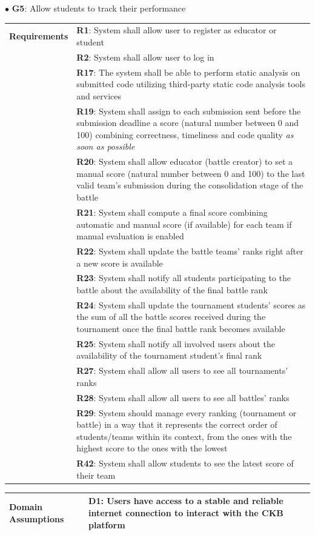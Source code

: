 \newpage
$\bullet$ \textbf{G5}: Allow students to track their performance
\begin{center}
    \begin{tabular}{ |m{3cm}|m{10cm}| }
        \hline
        \textbf{Requirements} 
        & \textbf{R1}: System shall allow user to register as educator or student \\
        & \textbf{R2}: System shall allow user to log in \\
        & \textbf{R17}: The system shall be able to perform static analysis on submitted code utilizing third-party static code analysis tools and services \\
        & \textbf{R19}: System shall assign to each submission sent before the submission deadline a score (natural number between 0 and 100) combining correctness, timeliness and code quality \textit{as soon as possible} \\
        & \textbf{R20}: System shall allow educator (battle creator) to set a manual score (natural number between 0 and 100) to the last valid team’s submission during the consolidation stage of the battle \\
        & \textbf{R21}: System shall compute a final score combining automatic and manual score (if available) for each team if manual evaluation is enabled \\
        & \textbf{R22}: System shall update the battle teams’ ranks right after a new score is available \\
        & \textbf{R23}: System shall notify all students participating to the battle about the availability of the final battle rank \\
        & \textbf{R24}: System shall update the tournament students’ scores as the sum of all the battle scores received during the tournament once the final battle rank becomes available \\
        & \textbf{R25}: System shall notify all involved users about the availability of the tournament student’s final rank \\
        & \textbf{R27}: System shall allow all users to see all tournaments’ ranks \\
        & \textbf{R28}: System shall allow all users to see all battles' ranks \\
        & \textbf{R29}: System should manage every ranking (tournament or battle) in a way that it represents the correct order of students/teams within its context, from the ones with the highest score to the ones with the lowest \\
        & \textbf{R42}: System shall allow students to see the latest score of their team \\    
        \hline
    \end{tabular}
    \begin{tabular}{ |m{3cm}|m{10cm}| }
        \hline
        \textbf{Domain \newline Assumptions} 
        & \textbf{D1}: Users have access to a stable and reliable internet connection to interact with the CKB platform \\
        \hline
    \end{tabular}
\end{center} 

